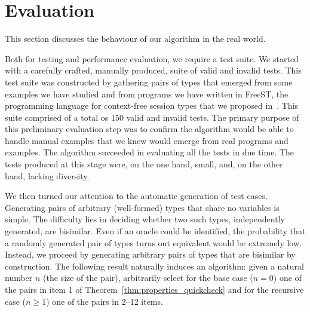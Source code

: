 \section{Evaluation}
\label{sec:evaluation}

This section discusses the behaviour of our algorithm in the real
world.

Both for testing and performance evaluation, we require a test
suite. We started with a carefully crafted, manually produced, suite of
valid and invalid tests. This test suite was constructed by gathering
pairs of types that emerged from some examples we have
studied and from programs we have written in FreeST, the programming language
for context-free session types that we
proposed in~\cite{almeida.etal_freest-functional-language}.
This suite comprised of a total os 150 valid and invalid tests.
The primary purpose of this preliminary evaluation
step was to confirm the algorithm would be able to handle
manual examples that we knew would emerge from real programs and
examples. The algorithm succeeded in evaluating all the tests in due time.
The tests produced at this stage were, on the one hand,
small, and, on the other hand, lacking diversity.

We then turned our
attention to the automatic generation of test cases. Generating pairs
of arbitrary (well-formed) types that share no variables is
simple. The difficulty lies in deciding whether two such types,
independently generated, are bisimilar. Even if an oracle could be
identified, the probability that a randomly generated pair of types
turns out equivalent would be extremely low. Instead, we proceed by
generating arbitrary pairs of types that are bisimilar by
construction. The following result naturally induces an algorithm:
given a natural number $n$ (the size of the pair), arbitrarily select
for the base case ($n=0$) one of the pairs in item 1 of
Theorem~\ref{thm:properties_quickcheck} and for the
recursive case ($n\ge1$) one of the pairs in 2--12 items.

